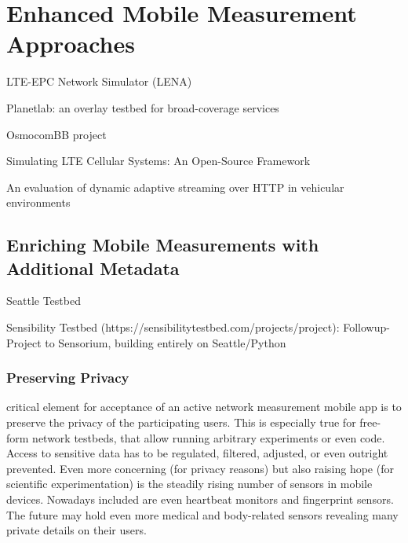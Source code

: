 

\section{Enhanced Mobile Measurement Approaches}
\label{c5:sec:mobilestreaming-measurements}


\gls{LTE}-\gls{EPC} Network Simulator (LENA)\cite{ns3lte}

Planetlab: an overlay testbed for broad-coverage services \cite{chun2003planetlab}

OsmocomBB project \cite{osmocombbwww}

Simulating LTE Cellular Systems: An Open-Source Framework \cite{5634134}



An evaluation of dynamic adaptive streaming over \gls{HTTP} in vehicular environments \cite{Muller:2012:EDA:2151677.2151686}



\subsection{Enriching Mobile Measurements with Additional Metadata}
\label{c5:sensorium}

Seattle Testbed

Sensibility Testbed (https://sensibilitytestbed.com/projects/project): Followup-Project to Sensorium, building entirely on Seattle/Python


\subsubsection{Preserving Privacy}

critical element for acceptance of an active network measurement mobile app is to preserve the privacy of the participating users. This is especially true for free-form network testbeds, that allow running arbitrary experiments or even code. Access to sensitive data has to be regulated, filtered, adjusted, or even outright prevented. Even more concerning (for privacy reasons) but also raising hope (for scientific experimentation) is the steadily rising number of sensors in mobile devices. Nowadays included are even heartbeat monitors and fingerprint sensors. The future may hold even more medical and body-related sensors revealing many private details on their users.

